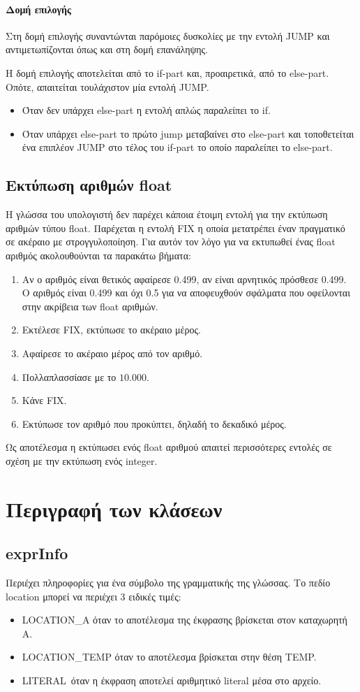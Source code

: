 \documentclass[12pt,a4paper]{report}
\begin{document}
\subsubsection{Δομή επιλογής}
Στη δομή επιλογής συναντώνται παρόμοιες δυσκολίες με την εντολή 
JUMP και αντιμετωπίζονται όπως και στη δομή επανάληψης.
\par
Η δομή επιλογής αποτελείται από το if-part και, προαιρετικά, από το 
else-part. Οπότε, απαιτείται τουλάχιστον μία εντολή JUMP. 
\begin{itemize}
    \item Όταν δεν υπάρχει else-part η εντολή απλώς παραλείπει το if.
    \item Όταν υπάρχει else-part το πρώτο jump μεταβαίνει στο else-part
            και τοποθετείται ένα επιπλέον JUMP στο τέλος του if-part το 
            οποίο παραλείπει το else-part.
\end{itemize}
\section{Εκτύπωση αριθμών float}
Η γλώσσα του υπολογιστή δεν παρέχει κάποια έτοιμη εντολή για την εκτύπωση 
αριθμών τύπου float. Παρέχεται η εντολή FIX η οποία μετατρέπει έναν 
πραγματικό σε ακέραιο με στρογγυλοποίηση. Για αυτόν τον λόγο για να 
εκτυπωθεί ένας float αριθμός ακολουθούνται τα παρακάτω βήματα:
\begin{enumerate}
    \item Αν ο αριθμός είναι θετικός αφαίρεσε 0.499, αν είναι αρνητικός 
            πρόσθεσε 0.499. Ο αριθμός είναι 0.499 και όχι 0.5 για να 
            αποφευχθούν σφάλματα που οφείλονται στην ακρίβεια των float 
            αριθμών.
    \item Εκτέλεσε FIX, εκτύπωσε το ακέραιο μέρος.
    \item Αφαίρεσε το ακέραιο μέρος από τον αριθμό.
    \item Πολλαπλασσίασε με το $10.000$.
    \item Κάνε FIX.
    \item Εκτύπωσε τον αριθμό που προκύπτει, δηλαδή το δεκαδικό μέρος.
\end{enumerate}
Ως αποτέλεσμα η εκτύπωσει ενός float αριθμού απαιτεί περισσότερες εντολές 
σε σχέση με την εκτύπωση ενός integer.
\chapter{Περιγραφή των κλάσεων}
\section*{exprInfo}
Περιέχει πληροφορίες για ένα σύμβολο της γραμματικής της γλώσσας. Το πεδίο 
location μπορεί να περιέχει 3 ειδικές τιμές:
\begin{itemize}
    \item LOCATION\_A όταν το αποτέλεσμα της έκφρασης βρίσκεται στον καταχωρητή Α.
    \item LOCATION\_TEMP όταν το αποτέλεσμα βρίσκεται στην θέση TEMP.
    \item LITERAL\ όταν η έκφραση αποτελεί αριθμητικό literal μέσα στο αρχείο.
\end{itemize}
\end{document}
